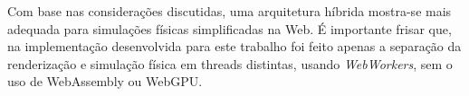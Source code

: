 
Com base nas considerações discutidas, uma arquitetura híbrida mostra-se mais adequada para simulações físicas simplificadas na Web. É importante frisar que, na implementação desenvolvida para este trabalho foi feito apenas a separação da renderização e simulação física em threads distintas, usando \textit{WebWorkers}, sem o uso de WebAssembly ou WebGPU.

